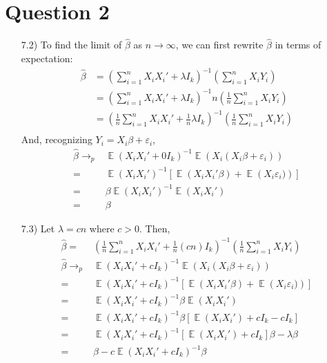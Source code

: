\documentclass{article}
\newcommand{\bhat}{\hat{\beta}}
\DeclareMathOperator{\E}{\mathbb{E}}%
\begin{document}

\section*{Question 2}
\begin{itemize}
	\item[7.2)] To find the limit of $\bhat$ as ${n\rightarrow\infty}$, we can first rewrite $\bhat$ in terms of expectation:
		\begin{align*}
			\bhat 	&= \left(\sum_{i=1}^n X_iX_i' + \lambda I_k\right)^{-1}\left(\sum_{i=1}^n X_iY_i\right)	\\
					&= \left(\sum_{i=1}^n X_iX_i' + \lambda I_k\right)^{-1}n\left(\frac{1}{n}\sum_{i=1}^n X_iY_i\right)	\\
					&= \left(\frac{1}{n}\sum_{i=1}^n X_iX_i' + \frac{1}{n}\lambda I_k\right)^{-1}\left(\frac{1}{n}\sum_{i=1}^n X_iY_i\right)	\\
		\end{align*}
		And, recognizing ${Y_i = X_i\beta + \varepsilon_i}$, 
		\begin{align*}
			\bhat 	\rightarrow_p 	&\E\left(X_iX_i' + 0 I_k\right)^{-1}\E\left(X_i(X_i\beta + \varepsilon_i)\right)	\\
					= 				&\E\left(X_iX_i'\right)^{-1}\left[\E\left(X_iX_i'\beta\right) + \E\left(X_i\varepsilon_i)\right)\right]	\\
					= 				&\beta\E\left(X_iX_i'\right)^{-1}\E\left(X_iX_i'\right) \\
					= 				&\beta
		\end{align*}
	
	\item[7.3)] Let $\lambda=cn$ where $c>0$. Then,
		\begin{align*}
			\bhat 	= 				&\left(\frac{1}{n}\sum_{i=1}^n X_iX_i' + \frac{1}{n}(cn) I_k\right)^{-1}\left(\frac{1}{n}\sum_{i=1}^n X_iY_i\right)	\\
			\bhat 	\rightarrow_p 	&\E\left(X_iX_i' + cI_k\right)^{-1}\E\left(X_i(X_i\beta + \varepsilon_i)\right)	\\
					= 				&\E\left(X_iX_i' + cI_k\right)^{-1}\left[\E\left(X_iX_i'\beta\right) + \E\left(X_i\varepsilon_i)\right)\right]	\\
					= 				&\E\left(X_iX_i' + cI_k\right)^{-1}\beta\E\left(X_iX_i'\right) \\
					= 				&\E\left(X_iX_i' + cI_k\right)^{-1}\beta\left[\E\left(X_iX_i'\right) + cI_k - cI_k\right] \\
					= 				&\E\left(X_iX_i' + cI_k\right)^{-1}\left[\E\left(X_iX_i'\right) + cI_k\right]\beta - \lambda\beta \\
					= 				&\beta - c\E\left(X_iX_i' + cI_k\right)^{-1}\beta
		\end{align*}
	

\end{itemize}
\end{document}
